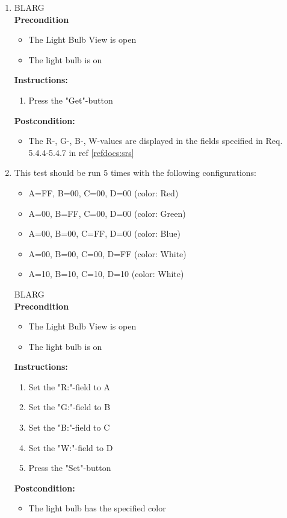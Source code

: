 \documentclass[a4paper]{article}
\newlength{\testlabellength}
\newenvironment{testlist}{\begin{enumerate}[label=\bfseries Instruction \thesubsection.\arabic* , labelindent=0pt, labelwidth=\testlabellength , leftmargin=2cm]}{\end{enumerate}}
\newenvironment{precondition}{
{\color{white}BLARG}\\ 
\textbf{Precondition}
\begin{itemize}[labelindent=0cm, labelwidth=2cm , leftmargin=1cm]
}
{\end{itemize}}
\newenvironment{instruction}{
\textbf{Instructions:}
\begin{enumerate}[label=\bfseries  \arabic*., labelindent=0cm, labelwidth=2cm , leftmargin=1cm]
}
{\end{enumerate}}
\newenvironment{postcondition}{
\textbf{Postcondition:}
\begin{itemize}[labelindent=0cm, labelwidth=2cm , leftmargin=1cm]
}
{\end{itemize}}
\begin{document}
\begin{appendices}
\begin{testlist}
	\item
		\begin{precondition}
			\item The Light Bulb View is open
			\item The light bulb is on
		\end{precondition}
		\begin{instruction}
			\item Press the "Get"-button
		\end{instruction}
		\begin{postcondition}
			\item The R-, G-, B-, W-values are displayed in the fields specified in Req. 5.4.4-5.4.7 in ref \ref{refdocs:srs}
		\end{postcondition}

	\item This test should be run 5 times with the following configurations:
		\begin{itemize}
			\item A=FF, B=00, C=00, D=00 (color: Red)
			\item A=00, B=FF, C=00, D=00 (color: Green)
			\item A=00, B=00, C=FF, D=00 (color: Blue)
			\item A=00, B=00, C=00, D=FF (color: White)
			\item A=10, B=10, C=10, D=10 (color: White)
		\end{itemize}
		\begin{precondition}
			\item The Light Bulb View is open
			\item The light bulb is on
		\end{precondition}
		\begin{instruction}
			\item Set the "R:"-field to A
			\item Set the "G:"-field to B
			\item Set the "B:"-field to C
			\item Set the "W:"-field to D
			\item Press the "Set"-button
		\end{instruction}
		\begin{postcondition}
			\item The light bulb has the specified color
		\end{postcondition}
		

\end{testlist}
\end{appendices}
\end{document}
